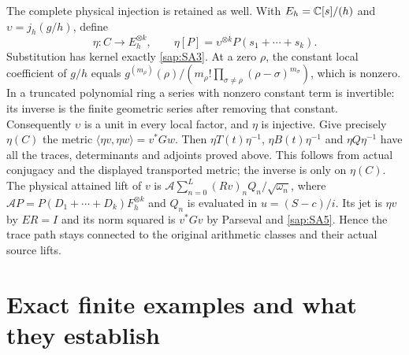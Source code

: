 \documentclass[11pt]{article}
\begin{document}
The complete physical injection is retained as well.
With $E_h=\mathbb C[s]/(h)$ and $\upsilon=j_h(g/h)$, define
\begin{equation}\tag{SA37}\label{sap:SA37}
\eta:C\longrightarrow E_h^{\otimes k},\qquad
\eta[P]=\upsilon^{\otimes k}P(s_1+\cdots+s_k).
\end{equation}
Substitution has kernel exactly \eqref{sap:SA3}.
At a zero $\rho$, the constant local coefficient of
$g/h$ equals
$g^{(m_\rho)}(\rho)/
(m_\rho!\prod_{\sigma\ne\rho}(\rho-\sigma)^{m_\sigma})$,
which is nonzero. In a truncated polynomial ring a
series with nonzero constant term is invertible: its
inverse is the finite geometric series after removing
that constant. Consequently $\upsilon$ is a unit in
every local factor, and $\eta$ is injective.
Give precisely $\eta(C)$ the metric
$\langle\eta v,\eta w\rangle=v^*Gw$.
Then $\eta T(t)\eta^{-1}$, $\eta B(t)\eta^{-1}$ and
$\eta Q\eta^{-1}$ have all the traces, determinants
and adjoints proved above. This follows from actual
conjugacy and the displayed transported metric; the
inverse is only on $\eta(C)$.
The physical attained lift of $v$ is
$\mathcal A\sum_{n=0}^L(Rv)_nQ_n/\sqrt{\omega_n}$,
where $\mathcal A P=P(D_1+\cdots+D_k)F_h^{\otimes k}$
and $Q_n$ is evaluated in $u=(S-c)/i$.
Its jet is $\eta v$ by $ER=I$ and its norm squared is
$v^*Gv$ by Parseval and \eqref{sap:SA5}.
Hence the trace path stays connected to the original
arithmetic classes and their actual source lifts.

\section{Exact finite examples and what they establish}
\end{document}
